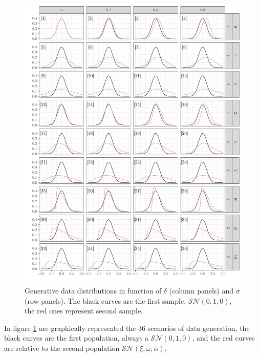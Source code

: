 \documentclass[twocolumn]{article}\usepackage[]{graphicx}\usepackage[]{xcolor}
\makeatletter
\def\maxwidth{ %
  \ifdim\Gin@nat@width>\linewidth
    \linewidth
  \else
    \Gin@nat@width
  \fi
}
\newenvironment{knitrout}{}{} %
\makeatother
\begin{document}
\begin{figure}
\begin{knitrout}
\color{fgcolor}

{\centering \includegraphics[width=\maxwidth]{figure/alpha0-1} 

}


\end{knitrout}
\caption{Generative data distributions in function of $\delta$ (column panels) and $\sigma$ (row panels). The black curves are the first sample, $\mathcal{SN}(0,1,0)$, the red ones represent second sample.\label{fig:alpha0}}
\end{figure}

In figure \ref{fig:alpha0} are graphically represented the 36 scenarios of data generation, the black curves are the first population, always a $\mathcal{SN}(0,1,0)$, and the red curves are relative to the second population $\mathcal{SN}(\xi,\omega,\alpha)$.
\end{document}
